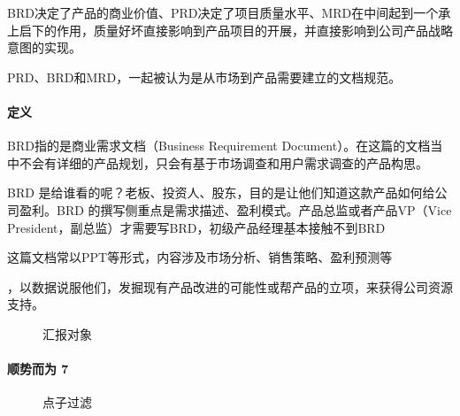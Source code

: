 \documentclass[letterpaper,10pt,english]{sphinxmanual}
\begin{document}
BRD决定了产品的商业价值、PRD决定了项目质量水平、MRD在中间起到一个承上启下的作用，质量好坏直接影响到产品项目的开展，并直接影响到公司产品战略意图的实现。

PRD、BRD和MRD，一起被认为是从市场到产品需要建立的文档规范。


\paragraph{定义}
\label{\detokenize{chapter_knowledge/BRD:id1}}
BRD指的是商业需求文档（Business Requirement
Document）。在这篇的文档当中不会有详细的产品规划，只会有基于市场调查和用户需求调查的产品构思。
%
\begin{footnote}[481]\sphinxAtStartFootnote
{}
%
\end{footnote}

BRD
是给谁看的呢？老板、投资人、股东，目的是让他们知道这款产品如何给公司盈利。BRD
的撰写侧重点是需求描述、盈利模式。产品总监或者产品VP（Vice
President，副总监）才需要写BRD，初级产品经理基本接触不到BRD

这篇文档常以PPT等形式，内容涉及市场分析、销售策略、盈利预测等%
\begin{footnote}[482]\sphinxAtStartFootnote
{}
%
\end{footnote}，以数据说服他们，发掘现有产品改进的可能性或帮产品的立项，来获得公司资源支持。

\begin{figure}[H]
\centering
\capstart

\noindent{}
\caption{汇报对象}\label{\detokenize{chapter_knowledge/BRD:id18}}\end{figure}


\paragraph{顺势而为 7\sphinxfootnotemark[483]}
\label{\detokenize{chapter_knowledge/BRD:id2}}%
\begin{footnotetext}[483]\sphinxAtStartFootnote
{}
%
\end{footnotetext}\ignorespaces 
\begin{figure}[H]
\centering
\capstart

\noindent{}
\caption{点子过滤}\label{\detokenize{chapter_knowledge/BRD:id19}}\end{figure}
\end{document}
